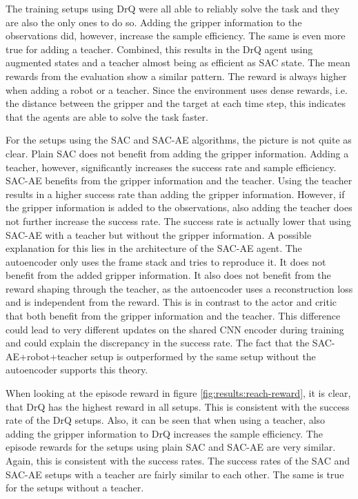 The training setups using DrQ were all able to reliably solve the task and they are also the only ones to do so. Adding the gripper information to the observations did, however, increase the sample efficiency. The same is even more true for adding a teacher. Combined, this results in the DrQ agent using augmented states and a teacher almost being as efficient as SAC state. The mean rewards from the evaluation show a similar pattern. The reward is always higher when adding a robot or a teacher. Since the environment uses dense rewards, i.e. the distance between the gripper and the target at each time step, this indicates that the agents are able to solve the task faster.

For the setups using the SAC and SAC-AE algorithms, the picture is not quite as clear. Plain SAC does not benefit from adding the gripper information. Adding a teacher, however, significantly increases the success rate and sample efficiency. SAC-AE benefits from the gripper information and the teacher. Using the teacher results in a higher success rate than adding the gripper information. However, if the gripper information is added to the observations, also adding the teacher does not further increase the success rate. The success rate is actually lower that using SAC-AE with a teacher but without the gripper information. A possible explanation for this lies in the architecture of the SAC-AE agent. The autoencoder only uses the frame stack and tries to reproduce it. It does not benefit from the added gripper information. It also does not benefit from the reward shaping through the teacher, as the autoencoder uses a reconstruction loss and is independent from the reward. This is in contrast to the actor and critic that both benefit from the gripper information and the teacher. This difference could lead to very different updates on the shared CNN encoder during training and could explain the discrepancy in the success rate. The fact that the SAC-AE+robot+teacher setup is outperformed by the same setup without the autoencoder supports this theory.

When looking at the episode reward in figure \ref{fig:results:reach-reward}, it is clear, that DrQ has the highest reward in all setups. This is consistent with the success rate of the DrQ setups. Also, it can be seen that when using a teacher, also adding the gripper information to DrQ increases the sample efficiency.
The episode rewards for the setups using plain SAC and SAC-AE are very similar. Again, this is consistent with the success rates. The success rates of the SAC and SAC-AE setups with a teacher are fairly similar to each other. The same is true for the setups without a teacher.

